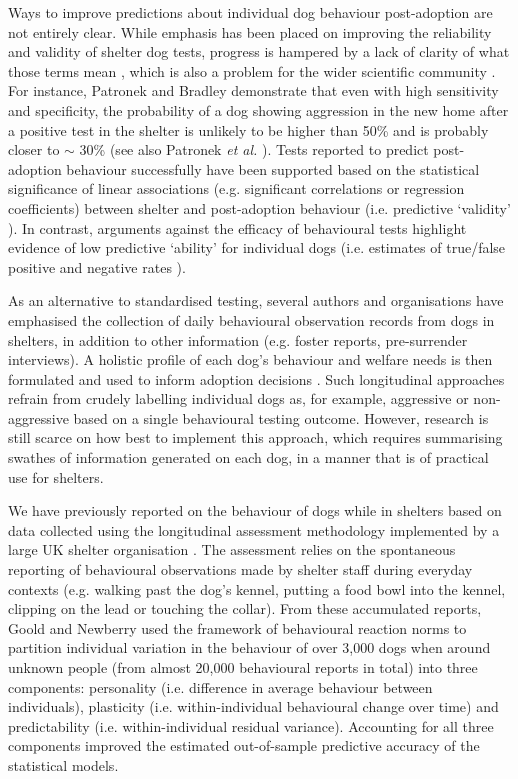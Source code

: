 \documentclass[fleqn,10pt]{wlscirep}
\begin{document}
Ways to improve predictions about individual dog behaviour post-adoption are not entirely clear. While emphasis has been placed on improving the reliability and validity of shelter dog tests, progress is hampered by a lack of clarity of what those terms mean \cite{patronek2019,rayment2015}, which is also a problem for the wider scientific community \cite{borsboom2004,borsboom2009,maul2016}. For instance, Patronek and Bradley \cite{patbrad2016} demonstrate that even with high sensitivity and specificity, the probability of a dog showing aggression in the new home after a positive test in the shelter is unlikely to be higher than 50\% and is probably closer to $\sim$ 30\% (see also Patronek \textit{et al.} \cite{patronek2019}). Tests reported to predict post-adoption behaviour successfully \cite{valsecchi2011,poulsen2010,bollen2008} have been supported based on the statistical significance of linear associations (e.g. significant correlations or regression coefficients) between shelter and post-adoption behaviour (i.e. predictive `validity' \cite{patronek2019}). In contrast, arguments against the efficacy of behavioural tests highlight evidence of low predictive `ability' for individual dogs (i.e. estimates of true/false positive and negative rates \cite{patronek2019}).

As an alternative to standardised testing, several authors and organisations have emphasised the collection of daily behavioural observation records from dogs in shelters, in addition to other information (e.g. foster reports, pre-surrender interviews). A holistic profile of each dog's behaviour and welfare needs is then formulated and used to inform adoption decisions \cite{patronek2019,ASPCA2018,rayment2015,mornement2015,clay2020}. Such longitudinal approaches refrain from crudely labelling individual dogs as, for example, aggressive or non-aggressive based on a single behavioural testing outcome. However, research is still scarce on how best to implement this approach, which requires summarising swathes of information generated on each dog, in a manner that is of practical use for shelters.

We have previously reported on the behaviour of dogs while in shelters based on data collected using the longitudinal assessment methodology implemented by a large UK shelter organisation \cite{goold2017aggressiveness,goold2017modelling}. The assessment relies on the spontaneous reporting of behavioural observations made by shelter staff during everyday contexts (e.g. walking past the dog's kennel, putting a food bowl into the kennel, clipping on the lead or touching the collar). From these accumulated reports, Goold and Newberry \cite{goold2017modelling} used the framework of behavioural reaction norms \cite{dingemanse2010,cleasby2015} to partition individual variation in the behaviour of over 3,000 dogs when around unknown people (from almost 20,000 behavioural reports in total) into three components: personality (i.e. difference in average behaviour between individuals), plasticity (i.e. within-individual behavioural change over time) and predictability (i.e. within-individual residual variance). Accounting for all three components improved the estimated out-of-sample predictive accuracy of the statistical models.
\end{document}
